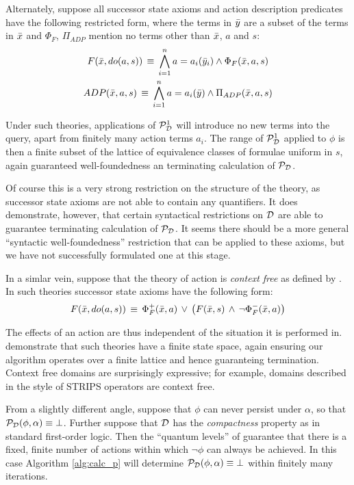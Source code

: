Alternately, suppose all successor state axioms and action description
predicates have the following restricted form, where the terms in
$\bar{y}$ are a subset of the terms in $\bar{x}$ and $\Phi_{F}$,
$\Pi_{ADP}$ mention no terms other than $\bar{x}$, $a$ and $s$:\begin{gather*}
F(\bar{x},do(a,s))\,\equiv\,\bigwedge_{i=1}^{n}a=a_{i}(\bar{y}_{i})\wedge\Phi_{F}(\bar{x},a,s)\\
ADP(\bar{x},a,s)\,\equiv\,\bigwedge_{i=1}^{n}a=a_{i}(\bar{y})\wedge\Pi_{ADP}(\bar{x},a,s)\end{gather*}


Under such theories, applications of $\mathcal{P}^{1}_{\mathcal{D}}$ will introduce no new
terms into the query, apart from finitely many action terms $a_{i}$.
The range of $\mathcal{P}^{1}_{\mathcal{D}}$ applied to $\phi$ is then a finite subset
of the lattice of equivalence classes of formulae uniform in $s$,
again guaranteed well-foundedness an terminating calculation of $\mathcal{P}_{\mathcal{D}}$.

Of course this is a very strong restriction on the structure of the
theory, as successor state axioms are not able to contain any quantifiers.
It does demonstrate, however, that certain syntactical restrictions
on $\mathcal{D}$ are able to guarantee terminating calculation of $\mathcal{P}_{\mathcal{D}}$.
It seems there should be a more general {}``syntactic well-foundedness''
restriction that can be applied to these axioms, but we have not successfully
formulated one at this stage.

In a simlar vein, suppose that the theory of action is \emph{context
free} as defined by \citep{reiter97progression}. In such theories
successor state axioms have the following form:\[
F(\bar{x},do(a,s))\,\equiv\,\Phi_{F}^{+}(\bar{x},a)\,\vee\,\left(F(\bar{x},s)\,\wedge\,\neg\Phi_{F}^{-}(\bar{x},a)\right)\]


The effects of an action are thus independent of the situation it
is performed in. \citet{levesque98what_robots_can_do} demonstrate
that such theories have a finite state space, again ensuring our algorithm
operates over a finite lattice and hence guaranteing termination.
Context free domains are surprisingly expressive; for example, domains
described in the style of STRIPS operators are context free.

From a slightly different angle, suppose that $\phi$ can never persist
under $\alpha$, so that $\mathcal{P}_{\mathcal{D}}(\phi,\alpha)\equiv\bot$. Further
suppose that $\mathcal{D}$ has the \emph{compactness} property as in standard
first-order logic. Then the {}``quantum levels'' of \citet{savelli06sc_quantum_levels}
guarantee that there is a fixed, finite number of actions within which
$\neg\phi$ can always be achieved. In this case Algorithm \ref{alg:calc_p}
will determine $\mathcal{P}_{\mathcal{D}}(\phi,\alpha)\equiv\bot$ within finitely many
iterations.

